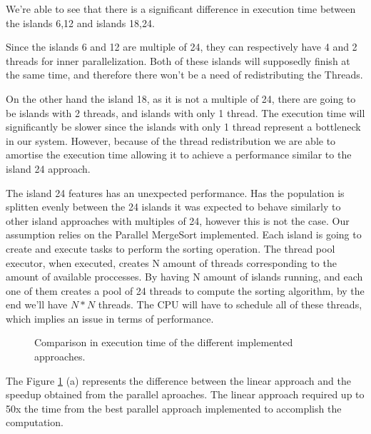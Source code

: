 \documentclass[runningheads]{llncs}
\begin{document}
We're able to see that there is a significant difference in execution time between the islands 6,12 and islands 18,24. 

Since the islands 6 and 12 are multiple of 24, they can respectively have 4 and 2 threads for inner parallelization. Both of these islands will supposedly finish at the same time, and therefore there won't be a need of redistributing the Threads.

On the other hand the island 18, as it is not a multiple of 24, there are going to be islands with 2 threads, and islands with only 1 thread. The execution time will significantly be slower since the islands with only 1 thread represent a bottleneck in our system. However, because of the thread redistribution we are able to amortise the execution time allowing it to achieve a performance similar to the island 24 approach.

The island 24 features has an unexpected performance. Has the population is splitten evenly between the 24 islands it was expected to behave similarly to other island approaches with multiples of 24, however this is not the case. Our assumption relies on the Parallel MergeSort implemented. Each island is going to create and execute tasks to perform the sorting operation. The thread pool executor, when executed, creates N amount of threads corresponding to the amount of available proccesses. By having N amount of islands running, and each one of them creates a pool of 24 threads to compute the sorting algorithm, by the end we'll have $N*N$ threads. The CPU will have to schedule all of these threads, which implies an issue in terms of performance.

\begin{figure}[H]
\centering
{}%
\qquad
{}%
\caption{Comparison in execution time of the different implemented approaches.} \label{comparacaolinear}
\label{comparacaoImpl}%
\end{figure}

The Figure \ref{comparacaoImpl} (a) represents the difference between the linear approach and the speedup obtained from the parallel aproaches. The linear approach required up to 50x the time from the best parallel approach implemented to accomplish the computation.
\end{document}
